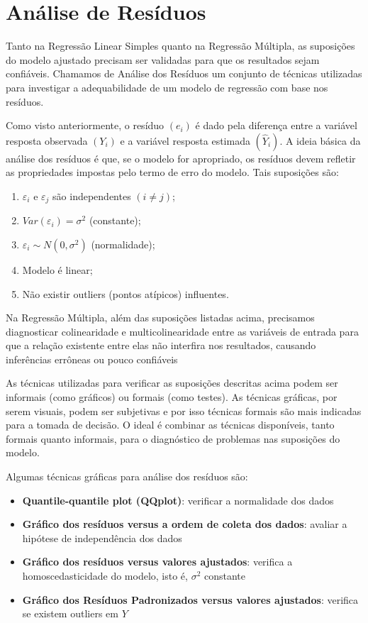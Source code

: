 \documentclass[
]{book}
\providecommand{\tightlist}{%
  \setlength{\itemsep}{0pt}\setlength{\parskip}{0pt}}
\begin{document}
\hypertarget{anuxe1lise-de-resuxedduos}{%
\section{Análise de Resíduos}\label{anuxe1lise-de-resuxedduos}}

Tanto na Regressão Linear Simples quanto na Regressão Múltipla, as suposições do modelo ajustado precisam ser validadas para que os resultados sejam confiáveis. Chamamos de Análise dos Resíduos um conjunto de técnicas utilizadas para investigar a adequabilidade de um modelo de regressão com base nos resíduos.

Como visto anteriormente, o resíduo \((e_i)\) é dado pela diferença entre a variável resposta observada \((Y_i)\) e a variável resposta estimada \((\widehat{Y}_i)\). A ideia básica da análise dos resíduos é que, se o modelo for apropriado, os resíduos devem refletir as propriedades impostas pelo termo de erro do modelo. Tais suposições são:

\begin{enumerate}
\def\labelenumi{\roman{enumi}.}
\tightlist
\item
  \(\varepsilon_i\) e \(\varepsilon_j\) são independentes \((i\neq j)\);
\item
  \(Var(\varepsilon_i) = \sigma^2\) (constante);
\item
  \(\varepsilon_i \sim N(0,\sigma^2)\) (normalidade);
\item
  Modelo é linear;
\item
  Não existir outliers (pontos atípicos) influentes.
\end{enumerate}

Na Regressão Múltipla, além das suposições listadas acima, precisamos diagnosticar colinearidade e multicolinearidade entre as variáveis de entrada para que a relação existente entre elas não interfira nos resultados, causando inferências errôneas ou pouco confiáveis

As técnicas utilizadas para verificar as suposições descritas acima podem ser informais (como gráficos) ou formais (como testes). As técnicas gráficas, por serem visuais, podem ser subjetivas e por isso técnicas formais são mais indicadas para a tomada de decisão. O ideal é combinar as técnicas disponíveis, tanto formais quanto informais, para o diagnóstico de problemas nas suposições do modelo.

Algumas técnicas gráficas para análise dos resíduos são:

\begin{itemize}
\tightlist
\item
  \textbf{Quantile-quantile plot (QQplot)}: verificar a normalidade dos dados
\item
  \textbf{Gráfico dos resíduos versus a ordem de coleta dos dados}: avaliar a hipótese de independência dos dados
\item
  \textbf{Gráfico dos resíduos versus valores ajustados}: verifica a homoscedasticidade do modelo, isto é, \(\sigma^2\) constante
\item
  \textbf{Gráfico dos Resíduos Padronizados versus valores ajustados}: verifica se existem outliers em \(Y\)
\end{itemize}
\end{document}
